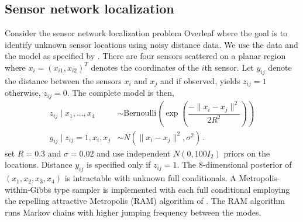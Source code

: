 \documentclass[11pt]{article}
\theoremstyle{remark}
\begin{document}





\subsection{Sensor network localization}

Consider the sensor network localization problem Overleaf \cite{ihler2005nonparametric} where the goal is to identify unknown sensor locations using noisy distance data. We use the data and the model as specified by \cite{tak2018repelling}. There are four sensors scattered on a planar region where $x_i = (x_{i1}, x_{i2})^T$ denotes the coordinates of the $i${th} sensor. Let $y_{ij}$ denote the distance between the sensors $x_i$ and $x_j$ and if observed, yields $z_{ij} = 1$ otherwise, $z_{ij} = 0$. The complete model is then,
\begin{align*}
    z_{ij} \mid x_1, ..., x_4 & \sim \text{Bernoulli}\left(\exp\left(\dfrac{-\|x_i - x_j\|^2}{2R^2}\right)\right)\\
    y_{ij} \mid z_{ij} = 1, x_i,x_j &\sim N \left(\|x_i - x_j\|^2, \sigma^2 \right)\,.
\end{align*}
%
\cite{tak2018repelling} set $R = 0.3$ and $\sigma = 0.02$ and use independent $N(0, 100I_2)$ priors on the locations. Distance $y_{ij}$ is specified only if $z_{ij} = 1$. The $8$-dimensional posterior of $(x_1, x_2, x_3, x_4)$ is intractable with unknown full conditionals. A Metropolis-within-Gibbs type sampler is implemented with each full conditional employing the repelling attractive Metropolis (RAM) algorithm of \cite{tak2018repelling}. The RAM algorithm runs Markov chains with higher jumping frequency between the modes.
\end{document}
